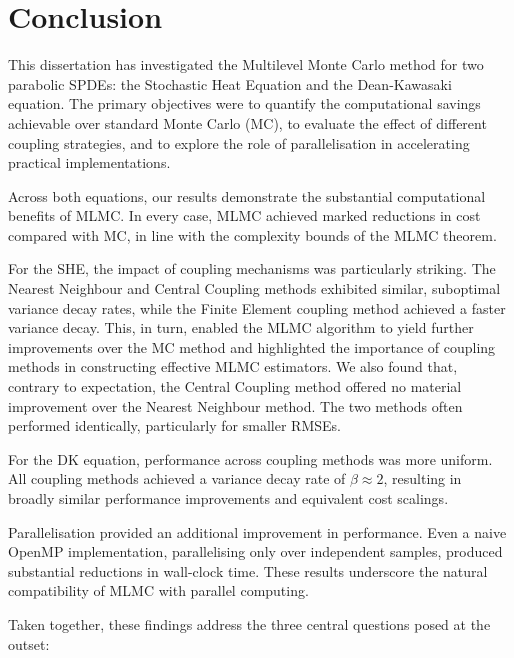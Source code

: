 \chapter{Conclusion}\label{chap:conclusion}

This dissertation has investigated the Multilevel Monte Carlo 
method for two parabolic SPDEs: the Stochastic Heat Equation and the 
Dean-Kawasaki equation. The primary objectives were to quantify the 
computational savings achievable over standard Monte Carlo 
(MC), to evaluate the effect of different coupling strategies, 
and to explore the role of parallelisation in accelerating practical 
implementations. 

Across both equations, our results demonstrate the substantial computational 
benefits of MLMC. In every case, MLMC achieved marked 
reductions in cost compared with MC, in line with 
the complexity bounds of the MLMC theorem. 

For the SHE, the impact of coupling mechanisms was 
particularly striking. The Nearest Neighbour and Central 
Coupling methods exhibited similar, 
suboptimal variance 
decay rates, while the Finite Element coupling method 
achieved a faster variance decay. This, in 
turn, enabled the MLMC algorithm to yield 
further improvements over the MC method and 
highlighted the importance of coupling methods 
in constructing effective MLMC estimators.
We also found that, contrary to expectation, 
the Central Coupling method offered no 
material improvement over the Nearest Neighbour method. The 
two methods often performed identically, particularly 
for smaller RMSEs. 

For the DK equation, performance across coupling 
methods was more uniform. All coupling 
methods achieved a variance decay rate of $\beta \approx 2$, 
resulting in broadly similar performance 
improvements and equivalent cost scalings. 

Parallelisation provided an additional improvement in performance.
Even a naive OpenMP implementation, parallelising only over 
independent samples, produced substantial reductions in wall-clock time. 
These results underscore the natural compatibility 
of MLMC with parallel computing. 

Taken together, these findings address the three central 
questions posed at the outset:

